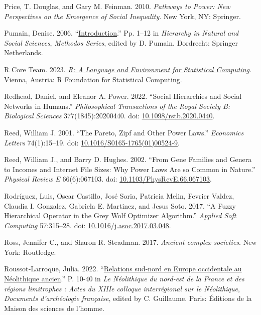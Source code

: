 \documentclass[
  12pt,
]{book}
\newlength{\cslhangindent}
\newlength{\cslentryspacingunit} %
\newenvironment{CSLReferences}[2] %
 {%
  \setlength{\parindent}{0pt}
  \ifodd #1
  \let\oldpar\par
  \def\par{\hangindent=\cslhangindent\oldpar}
  \fi
  \setlength{\parskip}{#2\cslentryspacingunit}
 }%
 {}
\begin{document}
\begin{CSLReferences}{1}{0}
\leavevmode{}%
Price, T. Douglas, and Gary M. Feinman. 2010. \emph{Pathways to Power: New Perspectives on the Emergence of Social Inequality}. New York, NY: Springer.

\leavevmode{}%
Pumain, Denise. 2006. {``\href{https://doi.org/10.1007/1-4020-4127-6_1}{Introduction}.''} Pp. 1--12 in \emph{Hierarchy in {Natural} and {Social Sciences}}, \emph{Methodos {Series}}, edited by D. Pumain. {Dordrecht}: {Springer Netherlands}.

\leavevmode{}%
R Core Team. 2023. \emph{\href{https://www.R-project.org/}{R: A Language and Environment for Statistical Computing}}. Vienna, Austria: R Foundation for Statistical Computing.

\leavevmode{}%
Redhead, Daniel, and Eleanor A. Power. 2022. {``Social Hierarchies and Social Networks in Humans.''} \emph{Philosophical Transactions of the Royal Society B: Biological Sciences} 377(1845):20200440. doi: \href{https://doi.org/10.1098/rstb.2020.0440}{10.1098/rstb.2020.0440}.

\leavevmode{}%
Reed, William J. 2001. {``The Pareto, Zipf and Other Power Laws.''} \emph{Economics Letters} 74(1):15--19. doi: \href{https://doi.org/10.1016/S0165-1765(01)00524-9}{10.1016/S0165-1765(01)00524-9}.

\leavevmode{}%
Reed, William J., and Barry D. Hughes. 2002. {``From Gene Families and Genera to Incomes and Internet File Sizes: Why Power Laws Are so Common in Nature.''} \emph{Physical Review E} 66(6):067103. doi: \href{https://doi.org/10.1103/PhysRevE.66.067103}{10.1103/PhysRevE.66.067103}.

\leavevmode{}%
Rodríguez, Luis, Oscar Castillo, José Soria, Patricia Melin, Fevrier Valdez, Claudia I. Gonzalez, Gabriela E. Martinez, and Jesus Soto. 2017. {``A Fuzzy Hierarchical Operator in the Grey Wolf Optimizer Algorithm.''} \emph{Applied Soft Computing} 57:315--28. doi: \href{https://doi.org/10.1016/j.asoc.2017.03.048}{10.1016/j.asoc.2017.03.048}.

\leavevmode{}%
Ross, Jennifer C., and Sharon R. Steadman. 2017. \emph{Ancient complex societies}. New York: Routledge.

\leavevmode{}%
Roussot‑Larroque, Julia. 2022. {``\href{https://doi.org/10.4000/books.editionsmsh.39018}{Relations sud‑nord en Europe occidentale au Néolithique ancien}.''} P. 10‑40 in \emph{Le Néolithique du nord-est de la France et des régions limitrophes : Actes du XIIIe colloque interrégional sur le Néolithique}, \emph{Documents d'archéologie française}, edited by C. Guillaume. {Paris}: {Éditions de la Maison des sciences de l'homme}.


\end{CSLReferences}
\end{document}
